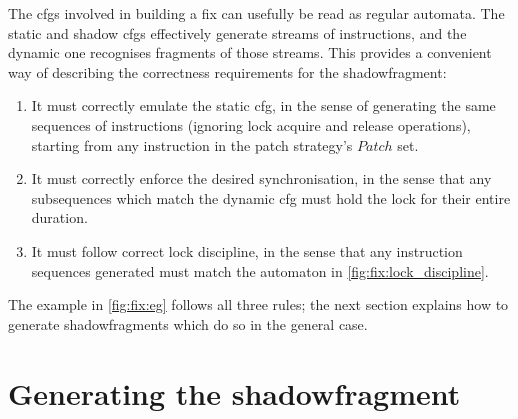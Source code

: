 The \glspl{cfg} involved in building a fix can usefully be read as
regular automata.  The static and shadow \glspl{cfg} effectively
generate streams of instructions, and the dynamic one recognises
fragments of those streams.  This provides a convenient way of
describing the correctness requirements for the \gls{shadowfragment}:
\begin{enumerate}
\item It must correctly emulate the \gls{static cfg}, in the sense of
  generating the same sequences of instructions (ignoring lock acquire
  and release operations), starting from any instruction in the patch
  strategy's $\mathit{Patch}$ set.
\item It must correctly enforce the desired synchronisation, in the
  sense that any subsequences which match the \gls{dynamic cfg} must
  hold the lock for their entire duration.
\item It must follow correct lock discipline, in the sense that any
  instruction sequences generated must match the automaton in
  \autoref{fig:fix:lock_discipline}.
\end{enumerate}
The example in \autoref{fig:fix:eg} follows all three rules; the next
section explains how to generate \glspl{shadowfragment} which do so in
the general case.
\vspace{-6pt}
\section[Generating the \glsentrytext{shadowfragment}]{Generating the \gls{shadowfragment}}


